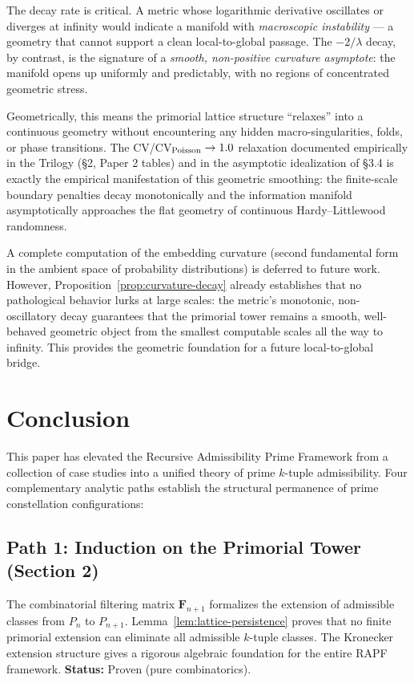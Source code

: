 \documentclass[11pt]{article}
\theoremstyle{remark}
\begin{document}
The decay rate is critical. A metric whose logarithmic derivative
oscillates or diverges at infinity would indicate a manifold with
\emph{macroscopic instability} --- a geometry that cannot support a clean
local-to-global passage. The $-2/\lambda$ decay, by contrast, is the
signature of a \emph{smooth, non-positive curvature asymptote}: the
manifold opens up uniformly and predictably, with no regions of
concentrated geometric stress.

Geometrically, this means the primorial lattice structure ``relaxes''
into a continuous geometry without encountering any hidden macro-singularities,
folds, or phase transitions. The CV/CV$_{\rm Poisson} \to 1.0$ relaxation
documented empirically in the Trilogy (\S{}2, Paper 2 tables) and in the
asymptotic idealization of \S{}3.4 is exactly the empirical manifestation
of this geometric smoothing: the finite-scale boundary penalties decay
monotonically and the information manifold asymptotically approaches the
flat geometry of continuous Hardy--Littlewood randomness.

A complete computation of the embedding curvature (second fundamental
form in the ambient space of probability distributions) is deferred to
future work. However, Proposition~\ref{prop:curvature-decay} already
establishes that no pathological behavior lurks at large scales: the
metric's monotonic, non-oscillatory decay guarantees that the primorial tower
remains a smooth, well-behaved geometric object from the smallest
computable scales all the way to infinity. This provides the
geometric foundation for a future local-to-global bridge.

\section{Conclusion}
\label{sec:conclusion}

This paper has elevated the Recursive Admissibility Prime Framework from
a collection of case studies into a unified theory of prime $k$-tuple
admissibility. Four complementary analytic paths establish the
structural permanence of prime constellation configurations:

\subsection*{Path 1: Induction on the Primorial Tower (Section 2)}
The combinatorial filtering matrix $\mathbf{F}_{n+1}$ formalizes the
extension of admissible classes from $P_n$ to $P_{n+1}$. Lemma~\ref{lem:lattice-persistence}
proves that no finite primorial extension can eliminate all admissible
$k$-tuple classes. The Kronecker extension structure gives a rigorous
algebraic foundation for the entire RAPF framework.
\textbf{Status:} Proven (pure combinatorics).
\end{document}
